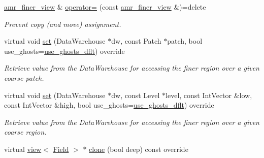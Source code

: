 \begin{DoxyCompactItemize}
\hyperlink{classUintah_1_1PhaseField_1_1detail_1_1amr__finer__view}{amr\+\_\+finer\+\_\+view} \& \hyperlink{classUintah_1_1PhaseField_1_1detail_1_1amr__finer__view_3_01ScalarField_3_01T_01_4_00_01Problem_810ae3f886a4d3bdb2b37c629369a2ec_a5b17dfade19e5fa6db10f185917fe731}{operator=} (const \hyperlink{classUintah_1_1PhaseField_1_1detail_1_1amr__finer__view}{amr\+\_\+finer\+\_\+view} \&)=delete
\begin{DoxyCompactList}\small\item\em Prevent copy (and move) assignment. \end{DoxyCompactList}\item 
virtual void \hyperlink{classUintah_1_1PhaseField_1_1detail_1_1amr__finer__view_3_01ScalarField_3_01T_01_4_00_01Problem_810ae3f886a4d3bdb2b37c629369a2ec_acc717dc37c60169bc4c85fbaaea766b3}{set} (Data\+Warehouse $\ast$dw, const Patch $\ast$patch, bool use\+\_\+ghosts=\hyperlink{classUintah_1_1PhaseField_1_1detail_1_1amr__finer__view_3_01ScalarField_3_01T_01_4_00_01Problem_810ae3f886a4d3bdb2b37c629369a2ec_aee5138b1c87ec5e7717b5f1dd6fd47cd}{use\+\_\+ghosts\+\_\+dflt}) override
\begin{DoxyCompactList}\small\item\em Retrieve value from the Data\+Warehouse for accessing the finer region over a given coarse patch. \end{DoxyCompactList}\item 
virtual void \hyperlink{classUintah_1_1PhaseField_1_1detail_1_1amr__finer__view_3_01ScalarField_3_01T_01_4_00_01Problem_810ae3f886a4d3bdb2b37c629369a2ec_a159ca4d3aaf8d45bd070ad7e4bf3561c}{set} (Data\+Warehouse $\ast$dw, const Level $\ast$level, const Int\+Vector \&low, const Int\+Vector \&high, bool use\+\_\+ghosts=\hyperlink{classUintah_1_1PhaseField_1_1detail_1_1amr__finer__view_3_01ScalarField_3_01T_01_4_00_01Problem_810ae3f886a4d3bdb2b37c629369a2ec_aee5138b1c87ec5e7717b5f1dd6fd47cd}{use\+\_\+ghosts\+\_\+dflt}) override
\begin{DoxyCompactList}\small\item\em Retrieve value from the Data\+Warehouse for accessing the finer region over a given coarse region. \end{DoxyCompactList}\item 
virtual \hyperlink{classUintah_1_1PhaseField_1_1detail_1_1view}{view}$<$ \hyperlink{structUintah_1_1PhaseField_1_1ScalarField}{Field} $>$ $\ast$ \hyperlink{classUintah_1_1PhaseField_1_1detail_1_1amr__finer__view_3_01ScalarField_3_01T_01_4_00_01Problem_810ae3f886a4d3bdb2b37c629369a2ec_a38bba423ebb77e4aaaded71c0c80583e}{clone} (bool deep) const override

\end{DoxyCompactItemize}

